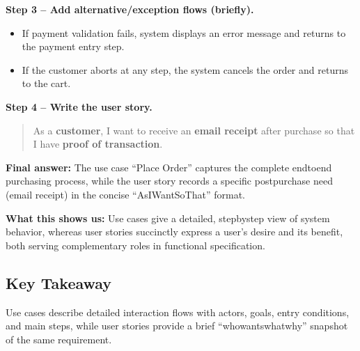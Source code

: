 \documentclass[12pt, a4paper]{article}
\begin{document}
\textbf{Step 3 -- Add alternative/exception flows (briefly).}
\begin{itemize}
  \item If payment validation fails, system displays an error message and returns to the payment entry step.
  \item If the customer aborts at any step, the system cancels the order and returns to the cart.
\end{itemize}

\textbf{Step 4 -- Write the user story.}
\begin{quote}
As a \textbf{customer}, I want to receive an \textbf{email receipt} after purchase so that I have \textbf{proof of transaction}.
\end{quote}

\textbf{Final answer:} The use case ``Place Order'' captures the complete endtoend purchasing process, while the user story records a specific postpurchase need (email receipt) in the concise ``AsIWantSoThat'' format.

\textbf{What this shows us:} Use cases give a detailed, stepbystep view of system behavior, whereas user stories succinctly express a user's desire and its benefit, both serving complementary roles in functional specification.

\subsection{Key Takeaway}
Use cases describe detailed interaction flows with actors, goals, entry conditions, and main steps, while user stories provide a brief ``whowantswhatwhy'' snapshot of the same requirement.
\end{document}
